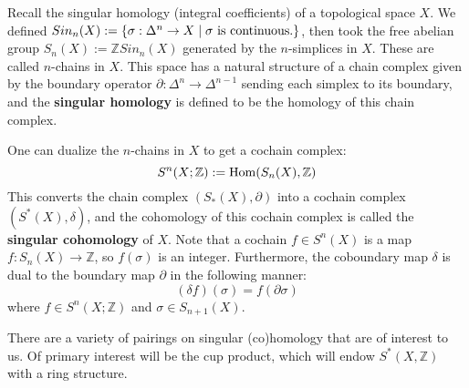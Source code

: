 Recall the singular homology (integral coefficients) of a topological space $X$. We defined $Sin_n(X) := \{\sigma : 
\Delta^n\rightarrow X\; | \;\sigma\textnormal{ is continuous.}\}$, then took the free abelian group $S_n(X) := \mathbb Z 
Sin_n(X)$ generated by the $n$-simplices in $X$. These are called $n$-chains in $X$. This space has a natural structure of a 
chain complex given by the boundary operator $\partial : \Delta^n\rightarrow\Delta^{n - 1}$ sending each simplex to its 
boundary, and the \textbf{singular homology} is defined to be the homology of this chain complex.

One can dualize the $n$-chains in $X$ to get a cochain complex:
\begin{equation}
	S^n(X; \mathbb Z) := \mathrm{Hom}(S_n(X), \mathbb Z)
\end{equation}
This converts the chain complex $(S_*(X), \partial)$ into a cochain complex $(S^*(X), \delta)$, and the cohomology of this 
cochain complex is called the \textbf{singular cohomology} of $X$. Note that a cochain $f\in S^n(X)$ is a map $f : 
S_n(X)\rightarrow\mathbb Z$, so $f(\sigma)$ is an integer. Furthermore, the coboundary map $\delta$ is dual to the 
boundary map $\partial$ in the following manner:
\begin{equation}
	(\delta f)(\sigma) = f(\partial\sigma)
\end{equation}
where $f\in S^n(X; \mathbb Z)$ and $\sigma\in S_{n + 1}(X)$. 

There are a variety of pairings on singular (co)homology that are of interest to us. Of primary interest will be the cup product, 
which will endow $S^*(X, \mathbb Z)$ with a ring structure. 

